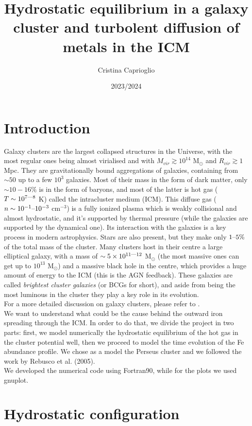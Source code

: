\documentclass{article}
\title{Hydrostatic equilibrium in a galaxy cluster and turbolent diffusion of metals in the ICM}
\author{Cristina Caprioglio}
\date{2023/2024 }
\begin{document}
\maketitle

\section*{Introduction}
Galaxy clusters are the largest collapsed structures in the Universe, with the most regular ones being almost virialised and with $M_{vir}\gtrsim 10^{14}$ M$_{\odot}$ and $R_{vir}\gtrsim 1$ Mpc. 
They are gravitationally bound aggregations of galaxies, containing from $\sim 50$ up to a few $10^{3}$ galaxies. Most of their mass in the form of dark matter, only $\sim 10-16\%$ is in the form of baryons, and most of the latter is hot gas ($T\sim 10^{7\text{\textemdash}8}$ K) called the intracluster medium (ICM). 
This diffuse gas ($n\sim 10^{-1}\text{\textendash}10^{-3}$ cm$^{-3}$) is a fully ionized plasma which is weakly collisional and almost hydrostatic, and it's supported by thermal pressure (while the galaxies are supported by the dynamical one). 
Its interaction with the galaxies is a key process in modern astrophysics.
Stars are also present, but they make only $1\text{\textendash}5\%$ of the total mass of the cluster. Many clusters host in their centre a large elliptical galaxy, with a mass of $\sim 5\times 10^{11\text{\textemdash}12}$ M$_{\odot}$ (the most massive ones can get up to $10^{13}$ M$_{\odot}$) and a massive black hole in the centre, which provides a huge amount of energy to the ICM (this is the AGN feedback). These galaxies are called \textit{brightest cluster galaxies} (or BCGs for short), and aside from being the most luminous in the cluster they play a key role in its evolution.
\\For a more detailed discussion on galaxy clusters, please refer to \cite[Sec. 6.4]{cimatti}.\\
We want to understand what could be the cause behind the outward iron spreading through the ICM. In order to do that, we divide the project in two parts: first, we model numerically the hydrostatic equilibrium of the hot gas in the cluster potential well, then we proceed to model the time evolution of the Fe abundance profile. We chose as a model the Perseus cluster and we followed the work by Rebusco et al. (2005)\cite{rebusco}.\\
We developed the numerical code using Fortran90, while for the plots we used gnuplot. 
\section{Hydrostatic configuration}
\end{document}

